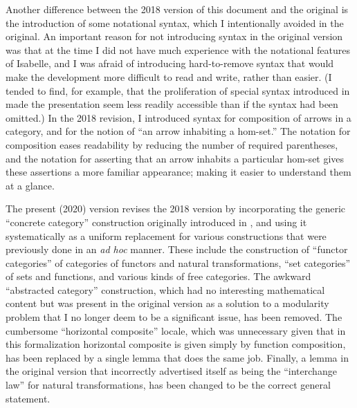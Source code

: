 \documentclass[11pt,notitlepage,a4paper]{report}
\begin{document}
Another difference between the 2018 version of this document and the original is the
introduction of some notational syntax, which I intentionally avoided in the original.
An important reason for not introducing syntax in the original version was that at the time
I did not have much experience with the notational features of Isabelle, and I was afraid
of introducing hard-to-remove syntax that would make the development more difficult to read
and write, rather than easier.  (I tended to find, for example, that the proliferation of
special syntax introduced in \cite{Katovsky-AFP10} made the presentation seem less readily
accessible than if the syntax had been omitted.)  In the 2018 revision, I introduced
syntax for composition of arrows in a category, and for the notion of ``an arrow inhabiting
a hom-set.''  The notation for composition eases readability by reducing the number of
required parentheses, and the notation for asserting that an arrow inhabits a particular
hom-set gives these assertions a more familiar appearance; making it easier to understand
them at a glance.

The present (2020) version revises the 2018 version by incorporating the generic
``concrete category'' construction originally introduced in \cite{Bicategory-AFP},
and using it systematically as a uniform replacement for various constructions that were
previously done in an {\em ad hoc} manner.  These include the construction of
``functor categories'' of categories of functors and natural transformations,
``set categories'' of sets and functions, and various kinds of free categories.
The awkward ``abstracted category'' construction, which had no interesting mathematical
content but was present in the original version as a solution to a modularity problem that
I no longer deem to be a significant issue, has been removed.
The cumbersome ``horizontal composite'' locale, which was unnecessary given that in this
formalization horizontal composite is given simply by function composition,
has been replaced by a single lemma that does the same job.
Finally, a lemma in the original version that incorrectly advertised itself as being
the ``interchange law'' for natural transformations, has been changed to be the
correct general statement.





\end{document}
